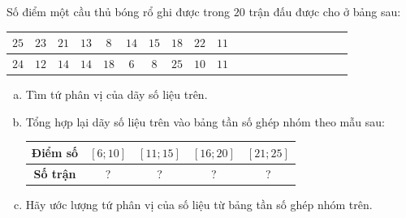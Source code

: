 \begin{bt}%
	Số điểm một cầu thủ bóng rổ ghi được trong $ 20 $ trận đấu được cho ở bảng sau:
	\begin{center}
		\begin{tabular}{|c|c|c|c|c|c|c|c|c|c|c|c|c|c|c|c|c|c|c|c|}
			\hline 
			$ 25 $	& $ 23 $ & $ 21 $ & $ 13 $ & $ 8 $ & $ 14 $ & $ 15 $ & $ 18 $ & $ 22 $ & $ 11 $ \\ 
			\hline 
			$ 24 $	& $ 12 $ & $ 14 $ & $ 14 $ & $ 18 $ & $ 6 $ & $ 8 $ & $ 25 $ & $ 10 $ & $ 11 $  \\ 
			\hline 
		\end{tabular} 
	\end{center}
	\begin{enumerate}[a)]
		\item Tìm tứ phân vị của dãy số liệu trên.
		\item Tổng hợp lại dãy số liệu trên vào bảng tần số ghép nhóm theo mẫu sau:
		\begin{center}
			\begin{tabular}{|c|c|c|c|c|}
				\hline 
				\textbf{Điểm số}	& $ \left[ 6 ; 10\right]  $ & $ \left[ 11 ; 15\right]  $ & $ \left[16 ; 20 \right]  $ & $ \left[ 21 ; 25\right]  $ \\ 
				\hline 
				\textbf{Số trận}	& ? & ? & ? & ? \\ 
				\hline 
			\end{tabular} 
		\end{center}
		\item Hãy ước lượng tứ phân vị của số liệu từ bảng tần số ghép nhóm trên.
	\end{enumerate}
\end{bt}
